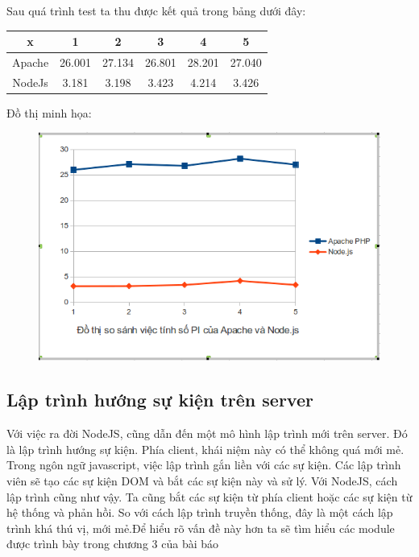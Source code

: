 Sau quá trình test ta thu được kết quả trong bảng dưới đây:	\\
	\begin{tabular}{|c|c|c|c|c|c|}
		\hline
		x & 1 & 2 & 3 & 4 & 5 \\
		\hline
		Apache & 26.001 & 27.134 & 26.801 & 28.201 & 27.040 \\
		\hline
		NodeJs & 3.181 & 3.198 & 3.423 & 4.214 & 3.426
		\\ \hline
	\end{tabular}


Đồ thị minh họa:\\
	\begin{figure}[-h]
		\centering
		\includegraphics[scale=0.6]{1_2.png}
	\end{figure}



\subsection{Lập trình hướng sự kiện trên server}
	Với việc ra đời NodeJS, cũng dẫn đến một mô hình lập trình mới trên server. Đó là lập trình hướng sự kiện. Phía client, khái niệm này có thể không quá mới mẻ. Trong ngôn ngữ javascript, việc lập trình gắn liền với các sự kiện. Các lập trình viên sẽ tạo các sự kiện DOM và bắt các sự kiện này và sử lý. Với NodeJS, cách lập trình cũng như vậy. Ta cũng bắt các sự kiện từ phía client hoặc các sự kiện từ hệ thống và phản hồi. So với cách lập trình truyền thống, đây là một cách lập trình khá thú vị, mới mẻ.Để hiểu rõ vấn đề này hơn ta sẽ tìm hiểu các module được trình bày trong chương 3 của bài báo
